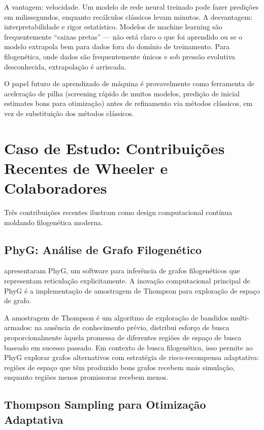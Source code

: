 A vantagem: velocidade. Um modelo de rede neural treinado pode fazer predições em milissegundos, enquanto recálculos clássicos levam minutos. A desvantagem: interpretabilidade e rigor estatístico. Modelos de machine learning são frequentemente ``caixas pretas'' --- não está claro o que foi aprendido ou se o modelo extrapola bem para dados fora do domínio de treinamento. Para filogenética, onde dados são frequentemente únicos e sob pressão evolutiva desconhecida, extrapolação é arriscada.

O papel futuro de aprendizado de máquina é provavelmente como ferramenta de aceleração de pilha (screening rápido de muitos modelos, predição de inicial estimates bons para otimização) antes de refinamento via métodos clássicos, em vez de substituição dos métodos clássicos.

\section{Caso de Estudo: Contribuições Recentes de Wheeler e Colaboradores}

Três contribuições recentes ilustram como design computacional contínua moldando filogenética moderna.

\subsection{PhyG: Análise de Grafo Filogenético}

\textcite{wheeler2024a} apresentaram PhyG, um software para inferência de grafos filogenéticos que representam reticulação explicitamente. A inovação computacional principal de PhyG é a implementação de amostragem de Thompson para exploração de espaço de grafo.

A amostragem de Thompson é um algoritmo de exploração de bandidos multi-armados: na ausência de conhecimento prévio, distribui esforço de busca proporcionalmente àquela promessa de diferentes regiões de espaço de busca baseado em sucesso passado. Em contexto de busca filogenética, isso permite ao PhyG explorar grafos alternativos com estratégia de risco-recompensa adaptativa: regiões de espaço que têm produzido bons grafos recebem mais simulação, enquanto regiões menos promissoras recebem menos.

\subsection{Thompson Sampling para Otimização Adaptativa}

